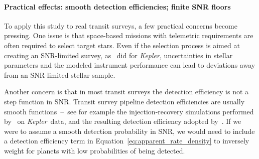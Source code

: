 \documentclass[12pt,modern]{aastex61}
\begin{document}

\paragraph{Practical effects: smooth detection efficiencies; finite SNR floors}
To apply this study to real transit surveys, a few practical concerns
become pressing.  One issue is that space-based missions with
telemetric requirements are often required to select target stars.
Even if the selection process is aimed at creating an SNR-limited
survey, as~\citet{batalha_selection_2010} did for {\it Kepler},
uncertainties in stellar parameters and the modeled instrument
performance can lead to deviations away from an SNR-limited stellar
sample.

Another concern is that in most transit surveys the detection
efficiency is not a step function in SNR.  Transit survey pipeline
detection efficiencies are usually smooth functions~--~see for example
the injection-recovery simulations performed
by~\citet{christiansen_measuring_2016} on {\it Kepler}\ data, and the
resulting detection efficiency adopted
by~\citet{fulton_california-_2017}.  If we were to assume a smooth
detection probability in SNR, we would need to include a detection
efficiency term in Equation~\ref{eq:apparent_rate_density} to
inversely weight for planets with low probabilities of being detected.
\end{document}
